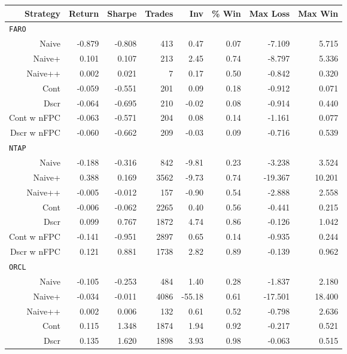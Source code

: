\begin{table}
\centering
{}
\begin{tabular}{@{} *{8}{r} @{}}
\toprule
Strategy & Return & Sharpe & Trades & Inv & \% Win & Max Loss & Max Win \\
\midrule
\multicolumn{8}{l}{\texttt{FARO}} \\
Naive & -0.879 & -0.808 & 413 & 0.47 & 0.07 & -7.109 & 5.715 \\ 
Naive+ & 0.101 & 0.107 & 213 & 2.45 & 0.74 & -8.797 & 5.336 \\ 
Naive++ & 0.002 & 0.021 & 7 & 0.17 & 0.50 & -0.842 & 0.320 \\ 
Cont & -0.059 & -0.551 & 201 & 0.09 & 0.18 & -0.912 & 0.071 \\ 
Dscr & -0.064 & -0.695 & 210 & -0.02 & 0.08 & -0.914 & 0.440 \\ 
Cont w nFPC & -0.063 & -0.571 & 204 & 0.08 & 0.14 & -1.161 & 0.077 \\ 
Dscr w nFPC & -0.060 & -0.662 & 209 & -0.03 & 0.09 & -0.716 & 0.539 \\[2ex]
\multicolumn{8}{l}{\texttt{NTAP}} \\
Naive & -0.188 & -0.316 & 842 & -9.81 & 0.23 & -3.238 & 3.524 \\ 
Naive+ & 0.388 & 0.169 & 3562 & -9.73 & 0.74 & -19.367 & 10.201 \\ 
Naive++ & -0.005 & -0.012 & 157 & -0.90 & 0.54 & -2.888 & 2.558 \\ 
Cont & -0.006 & -0.062 & 2265 & 0.40 & 0.56 & -0.441 & 0.215 \\ 
Dscr & 0.099 & 0.767 & 1872 & 4.74 & 0.86 & -0.126 & 1.042 \\ 
Cont w nFPC & -0.141 & -0.951 & 2897 & 0.65 & 0.14 & -0.935 & 0.244 \\ 
Dscr w nFPC & 0.121 & 0.881 & 1738 & 2.82 & 0.89 & -0.139 & 0.962 \\[2ex]
\multicolumn{8}{l}{\texttt{ORCL}} \\
Naive & -0.105 & -0.253 & 484 & 1.40 & 0.28 & -1.837 & 2.180 \\ 
Naive+ & -0.034 & -0.011 & 4086 & -55.18 & 0.61 & -17.501 & 18.400 \\ 
Naive++ & 0.002 & 0.006 & 132 & 0.61 & 0.52 & -0.798 & 2.636 \\ 
Cont & 0.115 & 1.348 & 1874 & 1.94 & 0.92 & -0.217 & 0.521 \\ 
Dscr & 0.135 & 1.620 & 1898 & 3.93 & 0.98 & -0.063 & 0.515 \\ 

\end{tabular}
\end{table}
